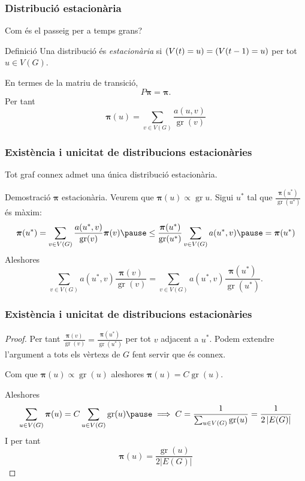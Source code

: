 \documentclass[aspectratio=169, 12pt]{beamer}
\let\P\relax
\DeclareMathOperator{\P}{P}
\renewcommand{\vec}[1]{\mathbf{\bm #1}}
\DeclareMathOperator{\gr}{gr}
\newcommand{\abs}[1]{\left\lvert #1 \right\rvert}
\begin{document}
\begin{frame}
	\frametitle{Distribució estacionària}
	Com és el passeig per a temps grans? \pause

	\begin{block}{Definició}
		Una distribució és \emph{estacionària} si \( \P(V(t) = u) = \P(V(t - 1) = u) \) per tot \( u \in V(G) \).
	\end{block} \pause

	En termes de la matriu de transició, \[ P\vec{\pi} = \vec{\pi}. \] \pause
	Per tant
	\begin{equation*}
		\vec{\pi}(u) = \sum_{v \in V(G)}\frac{a(u,v)}{\gr(v)}
	\end{equation*}

\end{frame}

\begin{frame}
	\frametitle{Existència i unicitat de distribucions estacionàries}
	\begin{theorem}
		Tot graf connex admet una única distribució estacionària.
	\end{theorem}
	\pause

	\begin{block}{Demostració}
		\( \vec{\pi} \) estacionària. Veurem que \( \vec{\pi}(u) \propto \gr{u} \). \pause Sigui \( u^\ast \) tal que \( \frac{\vec{\pi}(u^\ast)}{\gr(u^\ast)} \) és màxim: \pause 
		\begin{equation*}
			\vec{\pi}(u^\ast) = \sum_{v \in V(G)} \frac{a(u^\ast,v)}{\gr(v)} \vec{\pi}(v) \pause \leq \frac{\vec{\pi}(u^\ast)}{\gr(u^\ast)} \sum_{v \in V(G)} a(u^{\ast},v) \pause = \vec{\pi}(u^\ast)
		\end{equation*}
		Aleshores \[ \sum_{v \in V(G)} a(u^\ast,v) \frac{\vec{\pi}(v)}{\gr(v)}  = \sum_{v \in V(G)} a(u^\ast,v) \frac{\vec{\pi}(u^\ast)}{\gr(u^\ast)}. \]  
	\end{block}
\end{frame}

\begin{frame}
	\frametitle{Existència i unicitat de distribucions estacionàries}
	\begin{proof}
		Per tant \( \frac{\vec{\pi}(v)}{\gr(v)} = \frac{\vec{\pi}(u^\ast)}{\gr(u^\ast)} \) per tot \( v \) adjacent a \( u^\ast \). \pause
		Podem extendre l'argument a tots els vèrtexs de \( G \) fent servir que és connex. \pause

		Com que \( \vec{\pi}(u) \propto \gr(u) \) aleshores \( \vec{\pi}(u) = C\gr(u) \). \pause

		Aleshores
		\begin{equation*}
			\sum_{u \in V(G)} \vec{\pi}(u) = C \sum_{u \in V(G)} \gr(u) \pause \implies C = \frac{1}{\sum_{u \in V(G)} \gr(u)} = \frac{1}{2\abs{E(G)}}
		\end{equation*} \pause
		I per tant 
		\begin{equation*}
			\vec{\pi}(u) = \frac{\gr(u)}{2 \abs{E(G)}}
		\end{equation*}

	\end{proof}
\end{frame}
\end{document}
